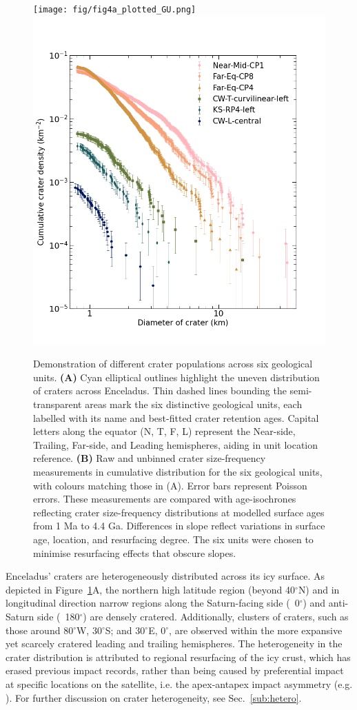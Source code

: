 \documentclass[preprint,12pt,3p,times,authoryear]{elsarticle}
\begin{document}
{\begin{figure}[ht!]
    \centering
    \texttt{[image: fig/fig4a\_plotted\_GU.png]}
    \includegraphics[width=0.5\linewidth]{fig/compare_fig4_icarus.png}
    \caption{Demonstration of different crater populations across six geological units.
        \textbf{(A)} Cyan elliptical outlines highlight the uneven distribution of craters across Enceladus. Thin dashed lines bounding the semi-transparent areas mark the six distinctive geological units, each labelled with its name and best-fitted crater retention ages. Capital letters along the equator (N, T, F, L) represent the Near-side, Trailing, Far-side, and Leading hemispheres, aiding in unit location reference.
        \textbf{(B)} Raw and unbinned crater size-frequency measurements in cumulative distribution for the six geological units, with colours matching those in (A). Error bars represent Poisson errors. These measurements are compared with age-isochrones reflecting crater size-frequency distributions at modelled surface ages from 1 Ma to 4.4 Ga. Differences in slope reflect variations in surface age, location, and resurfacing degree. The six units were chosen to minimise resurfacing effects that obscure slopes. }
    \label{fig:crater}
\end{figure}

Enceladus' craters are heterogeneously distributed across its icy surface. As depicted in Figure~\ref{fig:crater}A, the northern high latitude region (beyond 40$^\circ$N) and in longitudinal direction narrow regions along the Saturn-facing side (~0$^\circ$) and anti-Saturn side (~180$^\circ$) are densely cratered. Additionally, clusters of craters, such as those around 80$^\circ$W, 30$^\circ$S; and 30$^\circ$E, 0$^\circ$, are observed within the more expansive yet scarcely cratered leading and trailing hemispheres. The heterogeneity in the crater distribution is attributed to regional resurfacing of the icy crust, which has erased previous impact records, rather than being caused by preferential impact at specific locations on the satellite, i.e. the apex-antapex impact asymmetry (e.g. \citealt{Cuk2016}). For further discussion on crater heterogeneity, see Sec.~\ref{sub:hetero}.\\

}
\end{document}
